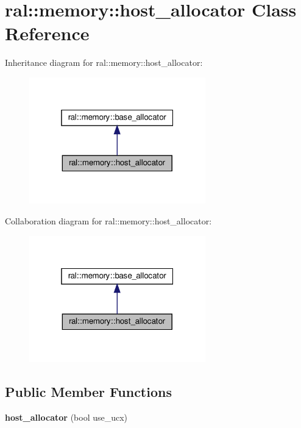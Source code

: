 \hypertarget{classral_1_1memory_1_1host__allocator}{}\section{ral\+:\+:memory\+:\+:host\+\_\+allocator Class Reference}
\label{classral_1_1memory_1_1host__allocator}


Inheritance diagram for ral\+:\+:memory\+:\+:host\+\_\+allocator\+:\nopagebreak
\begin{figure}[H]
\begin{center}
\leavevmode
\includegraphics[width=217pt]{classral_1_1memory_1_1host__allocator__inherit__graph}
\end{center}
\end{figure}


Collaboration diagram for ral\+:\+:memory\+:\+:host\+\_\+allocator\+:\nopagebreak
\begin{figure}[H]
\begin{center}
\leavevmode
\includegraphics[width=217pt]{classral_1_1memory_1_1host__allocator__coll__graph}
\end{center}
\end{figure}
\subsection*{Public Member Functions}
\begin{DoxyCompactItemize}
\item 
\mbox{\label{classral_1_1memory_1_1host__allocator_a208436947b265d2af4d0ff2818942a74}} 
{\bfseries host\+\_\+allocator} (bool use\+\_\+ucx)
\end{DoxyCompactItemize}
